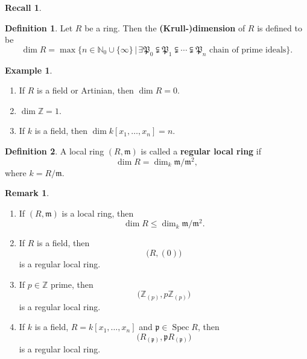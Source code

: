 \documentclass[12pt]{article}
\DeclareMathOperator{\Spec}{Spec}
\theoremstyle{definition}
\newtheorem*{definition}{Definition}
\newtheorem*{remark}{Remark}
\newtheorem*{recall}{Recall}
\newtheorem*{example}{Example}
\theoremstyle{remark}
\begin{document}
\begin{recall}
\begin{definition}
Let $R$ be a ring. Then the \textbf{(Krull-)dimension} of $R$ is defined to be
\[\dim R=\max\{n\in\mathbb{N}_0\cup\{\infty\}\,|\,\exists\mathfrak{P}_0\subsetneqq\mathfrak{P}_1\subsetneqq\cdots\subsetneqq\mathfrak{P}_n\text{ chain of prime ideals}\}.\]
\end{definition}

\begin{example}
\begin{enumerate}[label=\arabic*)]
\item If $R$ is a field or Artinian, then $\dim R=0$.

\item $\dim\mathbb{Z}=1$.

\item If $k$ is a field, then $\dim k[x_1,\ldots,x_n]=n$.
\end{enumerate}
\end{example}
\end{recall}

\begin{definition}
A local ring $(R,\mathfrak{m})$ is called a \textbf{regular local ring} if
\[\dim R=\dim_k\mathfrak{m}/\mathfrak{m}^2,\]
where $k=R/\mathfrak{m}$.
\end{definition}

\begin{remark}
\begin{enumerate}[label=\arabic*)]
\item If $(R,\mathfrak{m})$ is a local ring, then
\[\dim R\leq\dim_k\mathfrak{m}/\mathfrak{m}^2.\]

\item If $R$ is a field, then
\[\big(R,(0)\big)\]
is a regular local ring.

\item If $p\in\mathbb{Z}$ prime, then
\[\big(\mathbb{Z}_{(p)},p\mathbb{Z}_{(p)}\big)\]
is a regular local ring.

\item If $k$ is a field, $R=k[x_1,\ldots,x_n]$ and $\mathfrak{p}\in\Spec R$, then
\[\big(R_{(\mathfrak{p})},\mathfrak{p}R_{(\mathfrak{p})}\big)\]
is a regular local ring.
\end{enumerate}
\end{remark}
\end{document}
